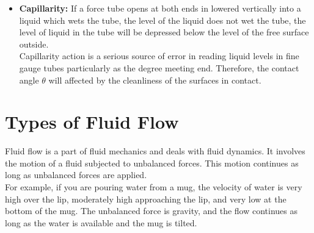 \documentclass[11pt]{report}
\newcommand{\bt}[1]{\textbf{#1}}
\begin{document}
\begin{itemize}[label=--]
		\item \bt{Capillarity: } If a force tube opens at both ends in lowered vertically into a liquid which wets the tube, the level of the liquid does not wet the tube, the level of liquid in the tube will be depressed below the level of the free surface outside.\\
		Capillarity action is a serious source of error in reading liquid levels in fine gauge tubes particularly as the degree meeting end. Therefore, the contact angle $\theta$ will affected by the cleanliness of the surfaces in contact.
	\end{itemize}
	
	\section{Types of Fluid Flow}
	Fluid flow is a part of fluid mechanics and deals with fluid dynamics. It involves the motion of a fluid subjected to unbalanced forces. This motion continues as long as unbalanced forces are applied.\\
	For example, if you are pouring water from a mug, the velocity of water is very high over the lip, moderately high approaching the lip, and very low at the bottom of the mug. The unbalanced force is gravity, and the flow continues as long as the water is available and the mug is tilted.\\
	
\end{document}
